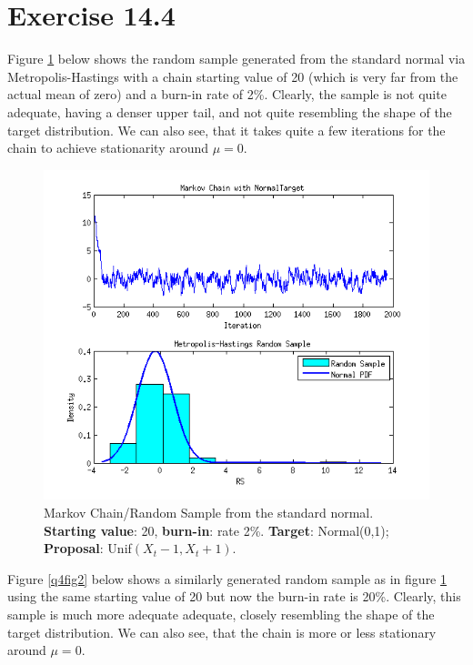 \documentclass[12pt,a4paper]{article}
\begin{document}
\section*{Exercise 14.4}
Figure \ref{q4fig1} below shows the random sample generated from the standard normal via Metropolis-Hastings with a chain starting value of 20 (which is very far from the actual mean of zero) and a burn-in rate of 2\%. Clearly, the sample is not quite adequate, having a denser upper tail, and not quite resembling the shape of the target distribution. We can also see, that it takes quite a few iterations for the chain to achieve stationarity around $\mu=0$.
\begin{figure}[ht!] 
\begin{center}
\includegraphics[scale=.95]{graph5.png}
\caption{Markov Chain/Random Sample from the standard normal. \textbf{Starting value}: 20, \textbf{burn-in}: rate 2\%. \textbf{Target}: Normal(0,1); \textbf{Proposal}: Unif$(X_t-1,X_t+1)$.}
\label{q4fig1}
\end{center}
\end{figure}
\FloatBarrier
\clearpage
Figure \ref{q4fig2} below shows a similarly generated random sample as in figure \ref{q4fig1} using the same starting value of 20 but now the burn-in rate is 20\%. Clearly, this sample is much more adequate adequate, closely resembling the shape of the target distribution. We can also see, that the chain is more or less stationary around $\mu=0$.
\end{document}
